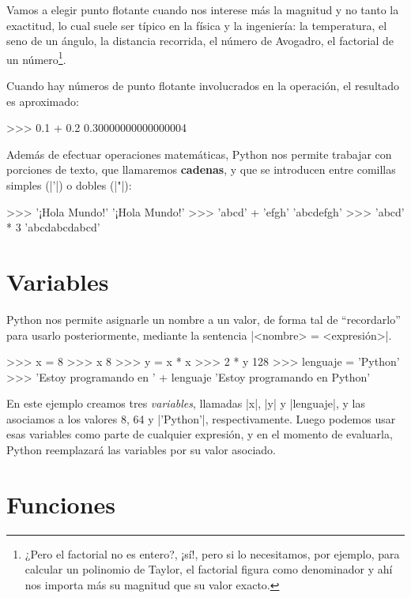 Vamos a elegir punto flotante cuando nos interese más la magnitud y no tanto la
exactitud, lo cual suele ser típico en la física y la ingeniería: la temperatura, el seno de un
ángulo, la distancia recorrida, el número de Avogadro, el factorial de un número\footnote{¿Pero
el factorial no es entero?, ¡sí!, pero si lo necesitamos, por ejemplo, para
calcular un polinomio de Taylor, el factorial figura como denominador y ahí nos
importa más su magnitud que su valor exacto.}.

Cuando hay números de punto flotante involucrados en la operación, el resultado es aproximado:

\begin{codigo-python-sn}
>>> 0.1 + 0.2
0.30000000000000004
\end{codigo-python-sn}

Además de efectuar operaciones matemáticas, Python nos permite trabajar con
porciones de texto, que llamaremos {\bf cadenas}, y que se introducen entre
comillas simples (|'|) o dobles (|"|):

\begin{codigo-python-sn}
>>> '¡Hola Mundo!'
'¡Hola Mundo!'
>>> 'abcd' + 'efgh'
'abcdefgh'
>>> 'abcd' * 3
'abcdabcdabcd'
\end{codigo-python-sn}

\section{Variables}

Python nos permite asignarle un nombre a un valor, de forma tal de
\enquote{recordarlo} para usarlo posteriormente, mediante la sentencia
|<nombre> = <expresión>|.

\begin{codigo-python-sn}
>>> x = 8
>>> x
8
>>> y = x * x
>>> 2 * y
128
>>> lenguaje = 'Python'
>>> 'Estoy programando en ' + lenguaje
'Estoy programando en Python'
\end{codigo-python-sn}

En este ejemplo creamos tres \emph{variables}, llamadas |x|, |y| y |lenguaje|, y
las asociamos a los valores 8, 64 y |'Python'|, respectivamente. Luego podemos
usar esas variables como parte de cualquier expresión, y en el momento de
evaluarla, Python reemplazará las variables por su valor asociado.

\section{Funciones}

